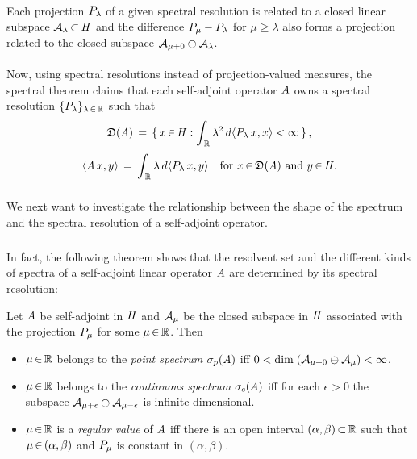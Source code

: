 \documentclass[11pt,twoside]{article}
\begin{document}
\paragraph*{}
Each projection ${P}_{\lambda}$ of a given spectral resolution
is related to a closed linear subspace $\mathcal{A}_{\lambda} {\,\subset\,} \mathit{H}$
and the difference ${P}_{\mu} - {P}_{\lambda}$
for $\mu \geq \lambda$ also forms a projection related to the closed subspace
$\mathcal{A}_{\mu+0} \ominus \mathcal{A}_{\lambda}$.

\paragraph*{}
Now,
using spectral resolutions instead of projection-valued measures,
the spectral theorem claims
that each self-adjoint operator $\mathit{A}$
owns a spectral resolution $\{{P}_{\lambda}\}_{\lambda {\,\in\,} {\mathbb{R}}}$
such that
\[
\mathfrak{D}(\mathit{A}) \,=\,
\{\, x {\,\in\,} \mathit{H}:
    \int_{\,{\mathbb{R}}}
\lambda^2 \, d \langle {P}_{\lambda} \,x,x \rangle < \infty\,\}\,,
\]
\[
\langle \mathit{A} \, x,y \rangle \,=\,
\int_{\,{\mathbb{R}}} \lambda \, d\langle {P}_{\lambda} \,x,y \rangle
\quad \mbox{for } x {\,\in\,} \mathfrak{D}(\mathit{A}) \mbox{ and } y {\,\in\,} \mathit{H}.
\]

\subsubsection*{} %
We next want to investigate the relationship between the shape of the spectrum
and the spectral resolution of a self-adjoint operator.

\subparagraph*{}
In fact,
the following theorem shows
that the resolvent set and the different kinds of spectra
of a self-adjoint linear operator $\mathit{A}$
are determined by its spectral resolution:

\begin{theorem}\label{SPECTRUM_RESOLUTION_THEOREM}
Let $\mathit{A}$ be self-adjoint in $\mathit{H}$
and $\mathcal{A}_{\mu}$ be the closed subspace in $\mathit{H}$
associated with the projection ${P}_{\mu}$ for some $\mu {\,\in\,} {\mathbb{R}}$.
Then

\begin{itemize}[leftmargin=12pt]
\item[1.]
$\mu {\,\in\,} {\mathbb{R}}$ belongs to the \textit{point spectrum} $\sigma_p(\mathit{A})$
iff
$0 < \operatorname{dim} \; (\mathcal{A}_{\mu+0} \ominus \mathcal{A}_{\mu}) < \infty$.

\item[2.]
$\mu {\,\in\,} {\mathbb{R}}$ belongs to the \textit{continuous spectrum} $\sigma_c(\mathit{A})$
iff
for each $\epsilon > 0$ the subspace
$\mathcal{A}_{\mu+\epsilon} \ominus \mathcal{A}_{\mu-\epsilon}$ is infinite-dimensional.

\item[3.]
$\mu {\,\in\,} {\mathbb{R}}$ is a \textit{regular value} of $\mathit{A}$
iff
there is an open interval $(\alpha,\beta) {\,\subset\,} {\mathbb{R}}$
such that $\mu {\,\in\,} (\alpha,\beta)$
and ${P}_{\mu}$ is constant in $(\alpha,\beta)$.
\end{itemize}
\end{theorem}
\end{document}
